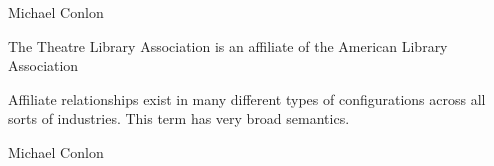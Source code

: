 \documentclass[letterpaper,10pt,english]{sphinxmanual}
\begin{document}
\begin{sphinxShadowBox}

\sphinxAtStartPar
Michael Conlon 
\end{sphinxShadowBox}

\begin{sphinxShadowBox}

\sphinxAtStartPar
{\hyperref[\detokenize{doc-ORG_0000001::doc}]{}}
\end{sphinxShadowBox}

\begin{sphinxShadowBox}

\sphinxAtStartPar
{\hyperref[\detokenize{doc-ORG_0000001::doc}]{}}
\end{sphinxShadowBox}

\begin{sphinxShadowBox}

\sphinxAtStartPar
The Theatre Library Association is an affiliate of the American Library Association
\end{sphinxShadowBox}

\begin{sphinxShadowBox}

\sphinxAtStartPar
Affiliate relationships exist in many different types of configurations across all sorts of industries.  This term has very broad semantics.
\end{sphinxShadowBox}

\begin{sphinxShadowBox}

\sphinxAtStartPar
{}
\end{sphinxShadowBox}

\begin{sphinxShadowBox}

\sphinxAtStartPar
Michael Conlon 
\end{sphinxShadowBox}
\begin{quote}

\ignorespaces \end{quote}
\end{document}
